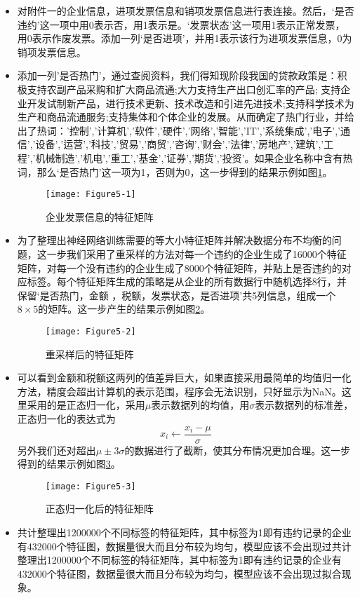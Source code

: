 \documentclass{cumcmthesis}
\begin{document}
\begin{itemize}
    \item  对附件一的企业信息，进项发票信息和销项发票信息进行表连接。然后，‘是否违约’这一项中用0表示否，用1表示是。‘发票状态’这一项用1表示正常发票，用0表示作废发票。添加一列‘是否进项’，并用1表示该行为进项发票信息，0为销项发票信息。
    \item 添加一列'是否热门'，通过查阅资料，我们得知现阶段我国的贷款政策是：积极支持农副产品采购和扩大商品流通;大力支持生产出口创汇率的产品; 支持企业开发试制新产品，进行技术更新、技术改造和引进先进技术;支持科学技术为生产和商品流通服务;支持集体和个体企业的发展。从而确定了热门行业，并给出了热词：'控制','计算机','软件','硬件','网络','智能','IT','系统集成','电子','通信','设备','运营','科技','贸易','商贸','咨询','财会','法律','房地产','建筑','工程','机械制造','机电','重工','基金','证券','期货','投资’。如果企业名称中含有热词，那么‘是否热门’这一项为1，否则为0，这一步得到的结果示例如图\ref{fig51}。
    \begin{figure}[H]
        \centering
        \texttt{[image: Figure5-1]}
        \caption{企业发票信息的特征矩阵}
        \label{fig51}
    \end{figure}
    \item 为了整理出神经网络训练需要的等大小特征矩阵并解决数据分布不均衡的问题，这一步我们采用了重采样的方法对每一个违约的企业生成了16000个特征矩阵，对每一个没有违约的企业生成了8000个特征矩阵，并贴上是否违约的对应标签。每个特征矩阵生成的策略是从企业的所有数据行中随机选择8行，并保留‘是否热门，金额 ，税额，发票状态，是否进项’共5列信息，组成一个$8 \times 5$的矩阵。这一步产生的结果示例如图\ref{fig52}。
    \begin{figure}[H]
        \centering
        \texttt{[image: Figure5-2]}
        \caption{重采样后的特征矩阵}
        \label{fig52}
    \end{figure}
    \item 可以看到金额和税额这两列的值差异巨大，如果直接采用最简单的均值归一化方法，精度会超出计算机的表示范围，程序会无法识别，只好显示为NaN。这里采用的是正态归一化，采用$\mu$表示数据列的均值，用$\sigma$表示数据列的标准差，正态归一化的表达式为
    \begin{equation}
        x_i \gets \frac{x_i-\mu}{\sigma}
        \label{equa1}
    \end{equation}
    另外我们还对超出$\mu \pm 3\sigma$的数据进行了截断，使其分布情况更加合理。这一步得到的结果示例如图\ref{fig53}。
    \begin{figure}[H]
        \centering
        \texttt{[image: Figure5-3]}
        \caption{正态归一化后的特征矩阵}
        \label{fig53}
    \end{figure}
    \item 共计整理出1200000个不同标签的特征矩阵，其中标签为1即有违约记录的企业有432000个特征图，数据量很大而且分布较为均匀，模型应该不会出现过共计整理出1200000个不同标签的特征矩阵，其中标签为1即有违约记录的企业有432000个特征图，数据量很大而且分布较为均匀，模型应该不会出现过拟合现象。
\end{itemize}
\end{document}
